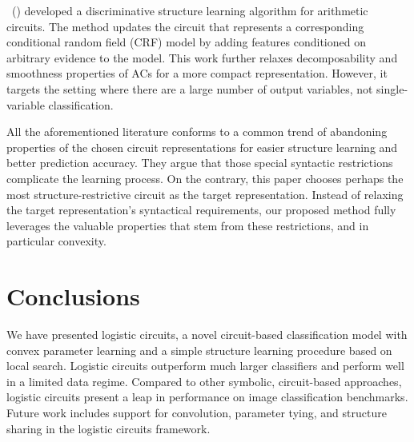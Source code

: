 \documentclass[letterpaper]{article} %
\newcommand{\citet}[1]{\citeauthor{#1}~(\citeyear{#1})}
\begin{document}
\citet{rooshenas2016discriminative} developed a discriminative structure learning algorithm for arithmetic circuits. The method updates the circuit that represents a corresponding conditional random field (CRF) model by adding features conditioned on arbitrary evidence to the model. This work further relaxes decomposability and smoothness properties of ACs for a more compact representation. However, it targets the setting where there are a large number of output variables, not single-variable classification.

All the aforementioned literature conforms to a common trend of abandoning properties of the chosen circuit representations for easier structure learning and better prediction accuracy. They argue that those special syntactic restrictions complicate the learning process. On the contrary, this paper chooses perhaps the most structure-restrictive circuit as the target representation. Instead of relaxing the target representation's syntactical requirements, our proposed method fully leverages the valuable properties that stem from these restrictions, and in particular convexity.

\section{Conclusions}

We have presented logistic circuits, a novel circuit-based classification model with convex parameter learning and a simple structure learning procedure based on local search. Logistic circuits outperform much larger classifiers and perform well in a limited data regime. Compared to other symbolic, circuit-based approaches, logistic circuits present a leap in performance on image classification benchmarks.
Future work includes support for convolution, parameter tying, and structure sharing in the logistic circuits framework.
\end{document}
